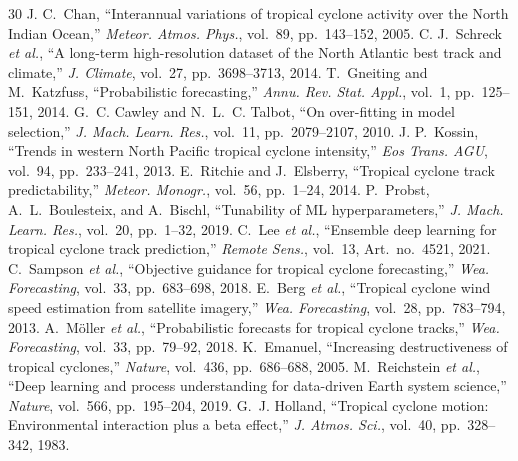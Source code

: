 \documentclass[11pt]{article}
\begin{document}
\begin{thebibliography}{30}
J. C.~Chan, ``Interannual variations of tropical cyclone activity over the North Indian Ocean,'' \textit{Meteor. Atmos. Phys.}, vol.~89, pp.~143--152, 2005.
C. J.~Schreck \textit{et al.}, ``A long-term high-resolution dataset of the North Atlantic best track and climate,'' \textit{J. Climate}, vol.~27, pp.~3698--3713, 2014.
T.~Gneiting and M.~Katzfuss, ``Probabilistic forecasting,'' \textit{Annu. Rev. Stat. Appl.}, vol.~1, pp.~125--151, 2014.
G.~C. Cawley and N.~L.~C. Talbot, ``On over-fitting in model selection,'' \textit{J. Mach. Learn. Res.}, vol.~11, pp.~2079--2107, 2010.
J. P.~Kossin, ``Trends in western North Pacific tropical cyclone intensity,'' \textit{Eos Trans. AGU}, vol.~94, pp.~233--241, 2013.
E.~Ritchie and J.~Elsberry, ``Tropical cyclone track predictability,'' \textit{Meteor. Monogr.}, vol.~56, pp.~1--24, 2014.
P.~Probst, A.~L.~Boulesteix, and A.~Bischl, ``Tunability of ML hyperparameters,'' \textit{J. Mach. Learn. Res.}, vol.~20, pp.~1--32, 2019.
C.~Lee \textit{et al.}, ``Ensemble deep learning for tropical cyclone track prediction,'' \textit{Remote Sens.}, vol.~13, Art.~no.~4521, 2021.
C.~Sampson \textit{et al.}, ``Objective guidance for tropical cyclone forecasting,'' \textit{Wea. Forecasting}, vol.~33, pp.~683--698, 2018.
E.~Berg \textit{et al.}, ``Tropical cyclone wind speed estimation from satellite imagery,'' \textit{Wea. Forecasting}, vol.~28, pp.~783--794, 2013.
A.~M\"oller \textit{et al.}, ``Probabilistic forecasts for tropical cyclone tracks,'' \textit{Wea. Forecasting}, vol.~33, pp.~79--92, 2018.
K.~Emanuel, ``Increasing destructiveness of tropical cyclones,'' \textit{Nature}, vol.~436, pp.~686--688, 2005.
M.~Reichstein \textit{et al.}, ``Deep learning and process understanding for data-driven Earth system science,'' \textit{Nature}, vol.~566, pp.~195--204, 2019.
G.~J. Holland, ``Tropical cyclone motion: Environmental interaction plus a beta effect,'' \textit{J. Atmos. Sci.}, vol.~40, pp.~328--342, 1983.
\end{thebibliography}
\end{document}
